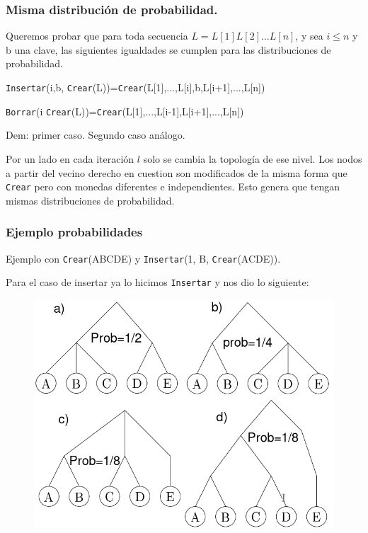 \documentclass[10pt,handout]{beamer}
\begin{document}

\begin{frame}
\frametitle{Misma distribución de probabilidad.}

Queremos probar que para toda secuencia $L=L[1]L[2]...L[n]$, y sea $i\leq n$ y b una clave,
las siguientes igualdades se cumplen para las distribuciones de probabilidad.

\pause
\begin{centering}
  \texttt{Insertar}(i,b, \texttt{Crear}(L))=\texttt{Crear}(L[1],...,L[i],b,L[i+1],...,L[n])
\end{centering}

\begin{centering}
  \texttt{Borrar}(i \texttt{Crear}(L))=\texttt{Crear}(L[1],...,L[i-1],L[i+1],...,L[n])
\end{centering}

\pause
Dem: primer caso. Segundo caso análogo.

\pause
Por un lado en cada iteración $l$ solo se cambia la topología de ese nivel.
Los nodos a partir del vecino derecho en cuestion son modificados de la misma forma que \texttt{Crear} pero con
monedas diferentes e independientes.
Esto genera que tengan mismas distribuciones de probabilidad.

\end{frame}


\begin{frame}
\frametitle{Ejemplo probabilidades}

Ejemplo con \texttt{Crear}(ABCDE) y \texttt{Insertar}(1, B, \texttt{Crear}(ACDE)).

Para el caso de insertar ya lo hicimos \texttt{Insertar} y nos dio lo siguiente:

\begin{figure}[h!]
    \centering
    \includegraphics[scale=0.3]{insertCreateRes.jpg}
\end{figure}

\end{frame}
\end{document}

